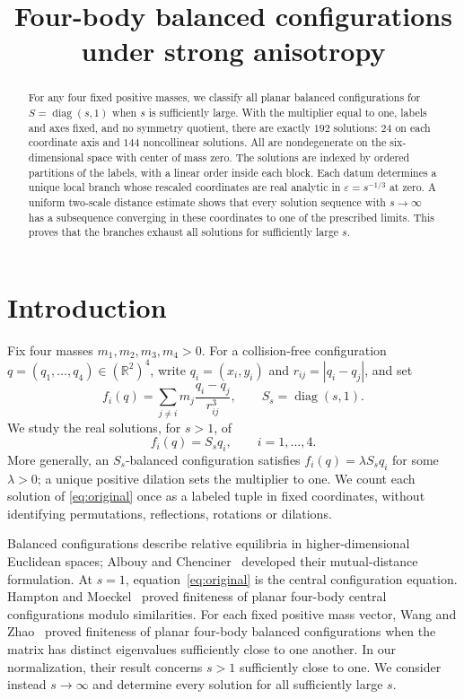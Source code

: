 \documentclass[11pt,a4paper]{amsart}
\title[Four-body balanced configurations under strong anisotropy]
{Four-body balanced configurations under strong anisotropy}
\date{}
\numberwithin{equation}{section}
\newcommand{\R}{\mathbb R}
\newcommand{\eps}{\varepsilon}
\DeclareMathOperator{\diag}{diag}
\begin{document}
\begin{abstract}
For any four fixed positive masses, we classify all planar balanced
configurations for $S=\diag(s,1)$ when $s$ is sufficiently large.
With the multiplier equal to one, labels and axes fixed, and no symmetry
quotient, there are exactly $192$ solutions: $24$ on each coordinate axis
and $144$ noncollinear solutions. All are nondegenerate on the
six-dimensional space with center of mass zero. The solutions are indexed
by ordered partitions of the labels, with a linear order inside each
block. Each datum determines a unique local branch whose rescaled
coordinates are real analytic in $\eps=s^{-1/3}$ at zero. A uniform
two-scale distance estimate shows that every solution sequence with
$s\to\infty$ has a subsequence converging in these coordinates to one
of the prescribed limits. This proves that the branches exhaust all
solutions for sufficiently large $s$.
\end{abstract}
\maketitle

\section{Introduction}\label{sec:introduction}

Fix four masses $m_1,m_2,m_3,m_4>0$. For a collision-free configuration
$q=(q_1,\ldots,q_4)\in(\R^2)^4$, write $q_i=(x_i,y_i)$ and
$r_{ij}=|q_i-q_j|$, and set
\[
 f_i(q)=\sum_{j\ne i}m_j\frac{q_i-q_j}{r_{ij}^3},\qquad
 S_s=\diag(s,1).
\]
We study the real solutions, for $s>1$, of
\begin{equation}\label{eq:original}
 f_i(q)=S_s q_i,\qquad i=1,\ldots,4.
\end{equation}
More generally, an $S_s$-balanced configuration satisfies
$f_i(q)=\lambda S_s q_i$ for some $\lambda>0$; a unique positive dilation
sets the multiplier to one. We count each solution of
\eqref{eq:original} once as a labeled tuple in fixed coordinates, without
identifying permutations, reflections, rotations or dilations.

Balanced configurations describe relative equilibria in higher-dimensional
Euclidean spaces; Albouy and Chenciner~\cite{AC} developed their
mutual-distance formulation. At $s=1$, equation~\eqref{eq:original}
is the central configuration equation. Hampton and Moeckel~\cite{HM}
proved finiteness of planar four-body central configurations modulo
similarities. For each fixed positive mass vector, Wang and
Zhao~\cite{WZ} proved finiteness of planar four-body balanced
configurations when the matrix has distinct eigenvalues sufficiently
close to one another. In our normalization, their result concerns
$s>1$ sufficiently close to one. We consider instead $s\to\infty$ and
determine every solution for all sufficiently large $s$.
\end{document}
